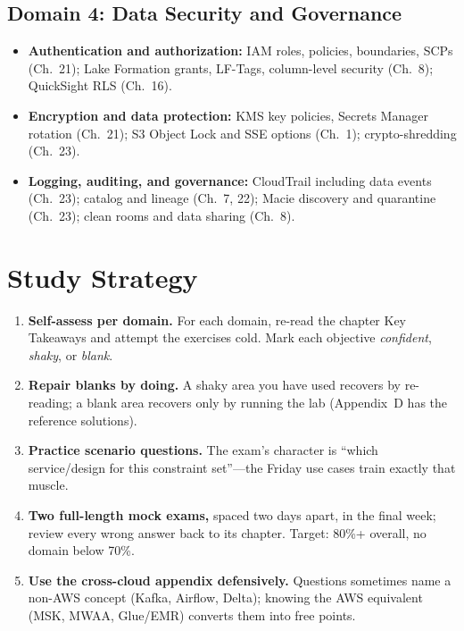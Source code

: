 \subsection{Domain 4: Data Security and Governance}
\begin{itemize}
    \item \textbf{Authentication and authorization:} IAM roles, policies, boundaries, SCPs
    (Ch.~21); Lake Formation grants, LF-Tags, column-level security (Ch.~8); QuickSight RLS
    (Ch.~16).
    \item \textbf{Encryption and data protection:} KMS key policies, Secrets Manager rotation
    (Ch.~21); S3 Object Lock and SSE options (Ch.~1); crypto-shredding (Ch.~23).
    \item \textbf{Logging, auditing, and governance:} CloudTrail including data events (Ch.~23);
    catalog and lineage (Ch.~7, 22); Macie discovery and quarantine (Ch.~23); clean rooms and
    data sharing (Ch.~8).
\end{itemize}

\section{Study Strategy}
%
\begin{enumerate}
    \item \textbf{Self-assess per domain.} For each domain, re-read the chapter Key Takeaways and
    attempt the exercises cold. Mark each objective \emph{confident}, \emph{shaky}, or
    \emph{blank}.
    \item \textbf{Repair blanks by doing.} A shaky area you have used recovers by re-reading; a
    blank area recovers only by running the lab (Appendix~D has the reference solutions).
    \item \textbf{Practice scenario questions.} The exam's character is ``which service/design
    for this constraint set''---the Friday use cases train exactly that muscle.
    \item \textbf{Two full-length mock exams,} spaced two days apart, in the final week; review
    every wrong answer back to its chapter. Target: 80\%+ overall, no domain below 70\%.
    \item \textbf{Use the cross-cloud appendix defensively.} Questions sometimes name a
    non-AWS concept (Kafka, Airflow, Delta); knowing the AWS equivalent (MSK, MWAA, Glue/EMR)
    converts them into free points.
\end{enumerate}

